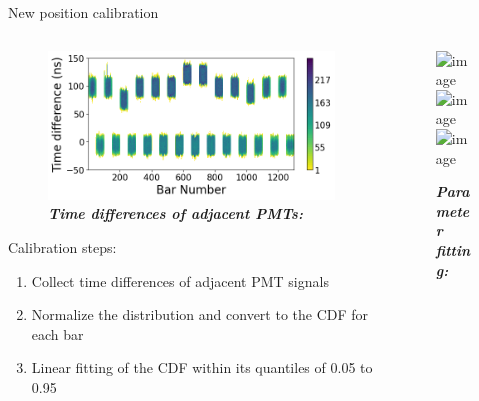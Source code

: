 \documentclass{ikpKoeln}
\begin{document}
\begin{frame}[t]{New position calibration}
	\vspace {-2.5em}
	\begin{columns}[t]
		\begin{column}{0.45 \textwidth}
			\begin{figure}
				\captionsetup{singlelinecheck=off}
				\caption*{\textit{\textbf{Time differences of adjacent PMTs:}}}
				\vspace{-0.5em}
				\includegraphics[width = \textwidth]{DPG2025/TimeDiffDist.png}
			\end{figure}
			\vspace{-1em}
			\begin{block}{Calibration steps:}
				\begin{enumerate}
					\setlength\itemsep{0em}
					\item<1-> Collect time differences of adjacent PMT signals
					\item<2-> Normalize the distribution and convert to the CDF for each bar
					\item<3-> Linear fitting of the CDF within its quantiles of 0.05 to 0.95
				\end{enumerate}
			\end{block}
		\end{column}
		\begin{column}{0.45 \textwidth}
			\begin{figure}
				\captionsetup{singlelinecheck=off}
				\caption*{\textit{\textbf{Parameter fitting:}}}
				\vspace*{-0.5em}
				\includegraphics<1>[width = 0.9\textwidth]{DPG2025/TimeDifference_0.png}%
				\includegraphics<2>[width = 0.9\textwidth]{DPG2025/TimeDifference_1.png}%
				\includegraphics<3>[width = 0.9\textwidth]{DPG2025/TimeDifference_2.png}%
			\end{figure}

\end{column}
\end{columns}
\end{frame}
\end{document}
